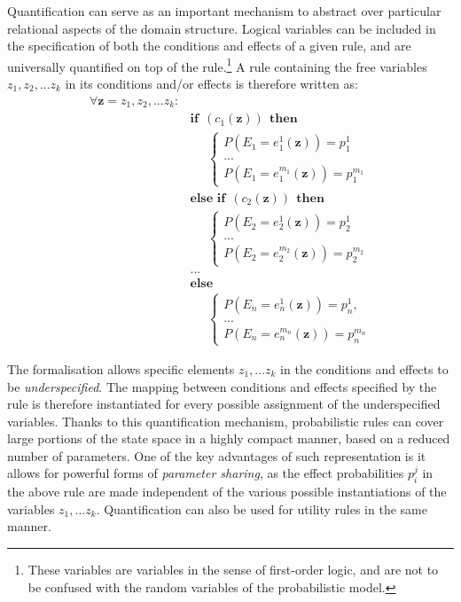 Quantification can serve as an important mechanism to abstract over particular relational aspects of the domain structure.  Logical variables can be included in the specification of both the conditions and effects of a given rule, and are universally quantified on top of the rule.\footnote{These variables are variables in the sense of first-order logic, and are not to be confused with the random variables of the probabilistic model.}  A rule containing the free variables $z_1,z_2,...z_k$ in its conditions and/or effects is therefore written as:
\begin{equation}
\begin{aligned}
\forall \mathbf{z} = z_1, z_2,...z_k: \\
& \textbf{if} \ \ (c_{1}(\mathbf{z})) \ \ \textbf{then} \\ 
& \;\;\;\;\; \begin{cases}
P(E_1\!=\!e_1^1(\mathbf{z})) = p_1^1 \\
 ... \\
P(E_1\!=\!e_1^{m_1}(\mathbf{z})) = p_1^{m_1} 
\end{cases} \\[3mm]
& \textbf{else if} \ \ (c_{2}(\mathbf{z})) \ \ \textbf{then} \\ 
& \;\;\;\;\; \begin{cases}
P(E_2\!=\!e_2^1(\mathbf{z})) = p_2^1 \\
 ... \\
P(E_2\!=\!e_2^{m_2}(\mathbf{z})) = p_2^{m_2} 
\end{cases} \\ 
& ...  \\
& \textbf{else} \\
& \;\;\;\;\; \begin{cases}
P(E_n\!=\!e_n^1(\mathbf{z})) = p_n^1, \\
... \\
P(E_n\!=\!e_n^{m_n}(\mathbf{z})) = p_n^{m_n}
\end{cases}
\end{aligned}
\label{eq:rulewithquant}
\end{equation}

The formalisation allows specific elements $z_1,...z_k$ in the conditions and effects to be \textit{underspecified}.  The mapping between conditions and effects specified by the rule is therefore instantiated for every possible assignment of the underspecified variables. Thanks to this quantification mechanism, probabilistic rules can cover large portions of the state space in a highly compact manner, based on a reduced number of parameters. One of the key advantages of such representation is it allows for powerful forms of \textit{parameter sharing}, as the effect probabilities $p_i^j$ in the above rule are made independent of the various possible instantiations of the variables $z_1,...z_k$. Quantification can also be used for utility rules in the same manner. 

